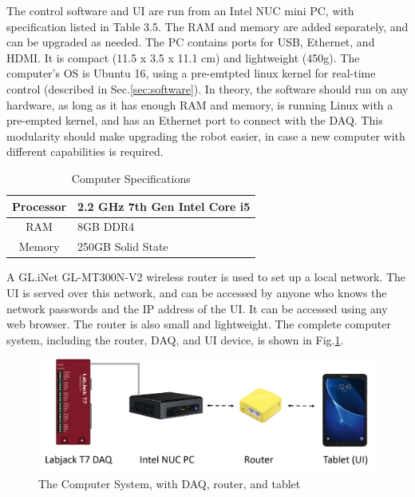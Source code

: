\documentclass[12pt]{report}
\begin{document}
	The control software and UI are run from an Intel NUC mini PC, with specification listed in Table 3.5. The RAM and memory are added separately, and can be upgraded as needed. The PC contains ports for USB, Ethernet, and HDMI. It is compact (11.5 x 3.5 x 11.1 cm) and lightweight (450g). The computer's OS is Ubuntu 16, using a pre-emtpted linux kernel for real-time control (described in Sec.\ref{sec:software}). In theory, the software should run on any hardware, as long as it has enough RAM and memory, is running Linux with a pre-empted kernel, and has an Ethernet port to connect with the DAQ. This modularity should make upgrading the robot easier, in case a new computer with different capabilities is required. 
	
	
	\begin{table}[h]
	\centering
	\caption{Computer Specifications}	
	\begin{tabular}{|c|l|}
		\hline
		Processor & 2.2 GHz 7th Gen Intel Core i5 \\ \hline
		RAM & 8GB DDR4 \\ \hline
		Memory & 250GB Solid State \\ \hline
		\end{tabular}
	\label{tab:comp}
	\end{table}
	
	 
	A GL.iNet GL-MT300N-V2 wireless router is used to set up a local network. The UI is served over this network, and can be accessed by anyone who knows the network passwords and the IP address of the UI. It can be accessed using any web browser. The router is also small and lightweight. The complete computer system, including the router, DAQ, and UI device, is shown in Fig.\ref{fig:comp}. 
	


	\begin{figure}[h] 
		\centering
		\includegraphics[width=\linewidth]{computer_system}
		\caption{The Computer System, with DAQ, router, and tablet}
		\label{fig:comp}
	\end{figure}
	
	
	
\end{document}
